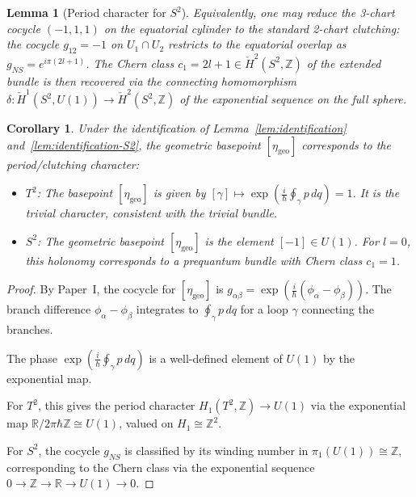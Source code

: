 \documentclass[11pt]{article}
\newtheorem{lemma}[theorem]{Lemma}
\newtheorem{corollary}[theorem]{Corollary}
\begin{document}
\begin{lemma}[Period character for $S^2$]
Equivalently, one may reduce the 3-chart cocycle $(-1, 1, 1)$ on the equatorial cylinder to the standard 2-chart clutching: the cocycle $g_{12} = -1$ on $U_1 \cap U_2$ restricts to the equatorial overlap as $g_{NS} = e^{i\pi(2l+1)}$. The Chern class $c_1 = 2l+1 \in \check{H}^2(S^2, \mathbb{Z})$ of the extended bundle is then recovered via the connecting homomorphism $\delta: \check{H}^1(S^2, U(1)) \to \check{H}^2(S^2, \mathbb{Z})$ of the exponential sequence on the full sphere.
\end{lemma}

\begin{corollary}
\label{cor:period}
Under the identification of Lemma~\ref{lem:identification} and~\ref{lem:identification-S2}, the geometric basepoint $[\eta_{\mathrm{geo}}]$ corresponds to the period/clutching character:

\begin{itemize}
  \item $T^2$: The basepoint $[\eta_{\mathrm{geo}}]$ is given by $[\gamma] \mapsto \exp(\tfrac{i}{\hbar}\oint_\gamma p\,dq) = 1$. It is the trivial character, consistent with the trivial bundle.
  \item $S^2$: The geometric basepoint $[\eta_{\mathrm{geo}}]$ is the element $[-1] \in U(1)$. For $l=0$, this holonomy corresponds to a prequantum bundle with Chern class $c_1 = 1$.
\end{itemize}
\end{corollary}

\begin{proof}
By Paper~I, the cocycle for $[\eta_{\mathrm{geo}}]$ is
$g_{\alpha\beta} = \exp(\tfrac{i}{\hbar}(\phi_\alpha - \phi_\beta))$.
The branch difference $\phi_\alpha - \phi_\beta$ integrates to
$\oint_\gamma p\,dq$ for a loop $\gamma$ connecting the branches.

The phase $\exp(\tfrac{i}{\hbar}\oint_\gamma p\,dq)$ is a well-defined
element of $U(1)$ by the exponential map.

For $T^2$, this gives the period character $H_1(T^2, \mathbb{Z}) \to U(1)$ via the exponential map $\mathbb{R}/2\pi\hbar\mathbb{Z} \cong U(1)$,
valued on $H_1 \cong \mathbb{Z}^2$.

For $S^2$, the cocycle $g_{NS}$ is classified by its winding number in
$\pi_1(U(1)) \cong \mathbb{Z}$, corresponding to the Chern class via
the exponential sequence $0 \to \mathbb{Z} \to \mathbb{R} \to U(1) \to 0$.
\end{proof}
\end{document}
